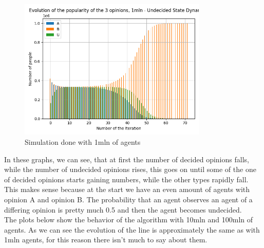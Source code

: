 \begin{figure}[H]
     \centering
     \includegraphics[width=0.80\textwidth,height=0.37\textheight]{img/svg/Undecided/1mln/barChart.png}
     \caption{Simulation done with 1mln of agents}
\end{figure}



In these graphs, we can see, that at first the number of decided opinions falls, while the number of undecided opinions rises, this goes on until some of the one of decided opinions starts gaining numbers, while the other types rapidly fall. This makes sense because at the start we have an even amount of agents with opinion A and opinion B. The probability that an agent observes an agent of a differing opinion is pretty much 0.5 and then the agent becomes undecided. \\

The plots below show the behavior of the algorithm with 10mln and 100mln of agents. As we can see the evolution of the line is approximately the same as with 1mln agents, for this reason there isn’t much to say about them.

